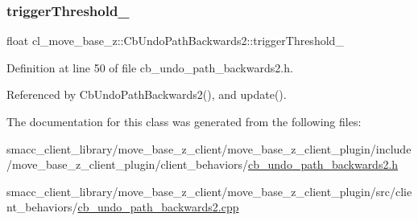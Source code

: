 \subsubsection{\texorpdfstring{trigger\+Threshold\+\_\+}{triggerThreshold\_}}
{\footnotesize\ttfamily float cl\+\_\+move\+\_\+base\+\_\+z\+::\+Cb\+Undo\+Path\+Backwards2\+::trigger\+Threshold\+\_\+\hspace{0.3cm}{\ttfamily [private]}}



Definition at line 50 of file cb\+\_\+undo\+\_\+path\+\_\+backwards2.\+h.



Referenced by Cb\+Undo\+Path\+Backwards2(), and update().



The documentation for this class was generated from the following files\+:\begin{DoxyCompactItemize}
\item 
smacc\+\_\+client\+\_\+library/move\+\_\+base\+\_\+z\+\_\+client/move\+\_\+base\+\_\+z\+\_\+client\+\_\+plugin/include/move\+\_\+base\+\_\+z\+\_\+client\+\_\+plugin/client\+\_\+behaviors/\hyperlink{cb__undo__path__backwards2_8h}{cb\+\_\+undo\+\_\+path\+\_\+backwards2.\+h}\item 
smacc\+\_\+client\+\_\+library/move\+\_\+base\+\_\+z\+\_\+client/move\+\_\+base\+\_\+z\+\_\+client\+\_\+plugin/src/client\+\_\+behaviors/\hyperlink{cb__undo__path__backwards2_8cpp}{cb\+\_\+undo\+\_\+path\+\_\+backwards2.\+cpp}\end{DoxyCompactItemize}
